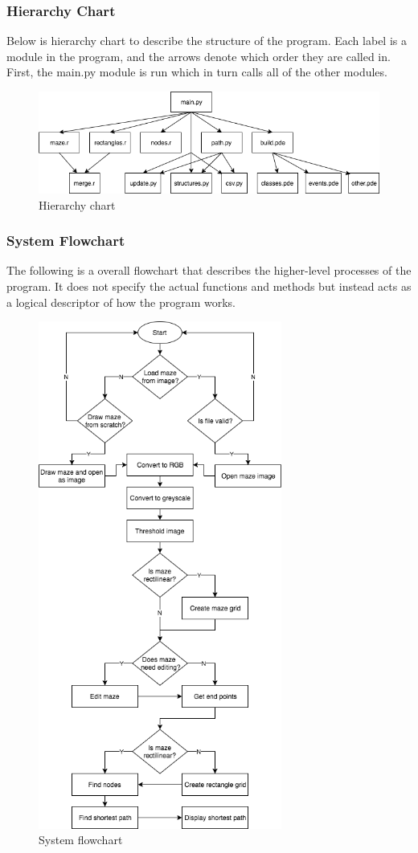 \documentclass[titlepage]{article}
\begin{document}
\subsubsection{Hierarchy Chart}
Below is hierarchy chart to describe the structure of the program. Each label is a module in the program, and the arrows denote which order they are called in. First, the main.py module is run which in turn calls all of the other modules.
\begin{figure}[H]
  \centering
  \includegraphics[width=12cm]{Hierarchy.png}
  \caption{Hierarchy chart}
  \label{fig:dijk}
\end{figure}

\subsubsection{System Flowchart}
The following is a overall flowchart that describes the higher-level processes of the program. It does not specify the actual functions and methods but instead acts as a logical descriptor of how the program works.
\begin{figure}[H]
  \centering
  \includegraphics[width=8cm]{Flowchart.png}
  \caption{System flowchart}
  \label{fig:dijk}
\end{figure}
\end{document}
